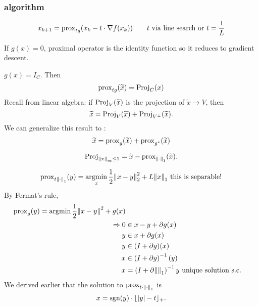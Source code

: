 \documentclass[class=article,crop=false]{standalone}
\begin{document}
\subsubsection{algorithm}
\begin{align*}
	x_{k+1} = \operatorname{prox}_{t g} (x_k - t \cdot \nabla f(x_k))\qquad t\text{ via line search or } t=\frac{1}{L} 
\end{align*}
\begin{remark}
	If $ g(x)=0$, proximal operator is the identity function so it reduces to gradient descent.
\end{remark}

\begin{eg}
	$ g(x) = I_C$. Then
	 \begin{align*}
		 \operatorname{prox}_{t g} (\widetilde{ x}) = \operatorname{Proj}_C(x)
	\end{align*}
	Recall from linear algebra: if $ \operatorname{Proj}_V(\widetilde{ x})$ is the projection of $ \widetilde{ x} \to V$, then
	\[
		\widetilde{ x} =\operatorname{Proj}_V(\widetilde{ x}) + \operatorname{Proj}_{V^{\perp}}(\widetilde{ x})
	.\]
	We can generalize this result to : 
	\begin{align*}
		\widetilde{ x} = \operatorname{prox}_g (\widetilde{ x}) + \operatorname{prox}_{g^* } (\widetilde{ x})
	\end{align*}
\end{eg}
	\begin{eg}
	\[
		\operatorname{Proj}_{{\left\lVert{ x}\right\rVert}_{\infty} \leq 1} = \widetilde{ x} - \operatorname{prox}_{{\left\lVert{ \cdot }\right\rVert}_1 } (\widetilde{ x})
	.\] 

	\begin{align*}
		\operatorname{prox}_{t {\left\lVert{ \cdot }\right\rVert}_1 } (y) = \operatorname*{argmin}_x \frac{1}{2} {\left\lVert{ x-y}\right\rVert}_2 ^2 + L {\left\lVert{ x}\right\rVert}_1 \text{ this is separable!}
	\end{align*}
	By Fermat's rule,
	\begin{align*}
		\operatorname{prox}_g (y) = \operatorname*{argmin} \frac{1}{2}{\left\lVert{ x-y}\right\rVert}^2 + g(x)\\
		\Rightarrow 0 &\in x-y + \partial g(x)\\
		y&\in x + \partial g(x)  \\
		y & \in (I+\partial g)(x)  \\
		x&\in \left( I+ \partial g \right)^{-1} (y)   \\
		x&= \left( I+ \partial {\left\lVert{ }\right\rVert}_1  \right)^{-1} y  \text{ unique solution s.c.}
	\end{align*}
	We derived earlier that the solution to $ \operatorname{prox}_{t \cdot {\left\lVert{ \cdot }\right\rVert}_1 }$ is
	\[
		x= \operatorname{sgn}(y) \cdot \lfloor |y| - t\rfloor_{+}
	.\] 
	\end{eg}
\end{document}
